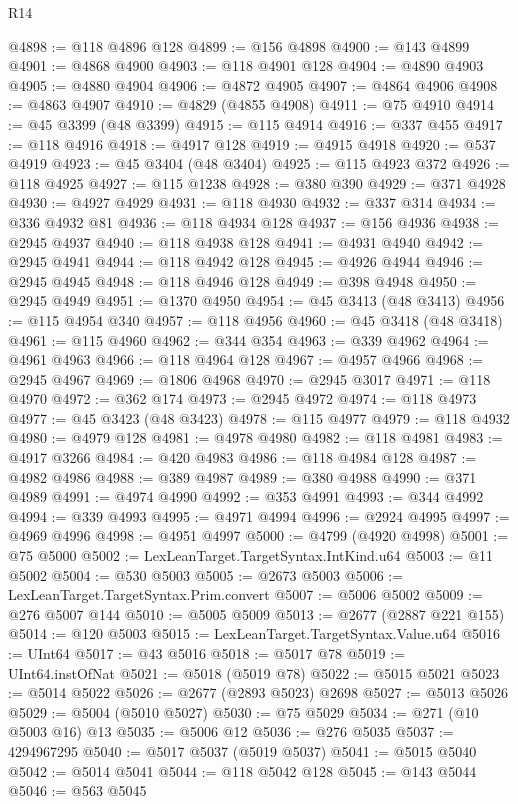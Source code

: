 \begin{lexlean}{R14}
\begin{coremodule}
{{{{{{{{{{{{{{{{{{{{{{{{{{{{{{{{{{{{{{{{{{{{{{{{{{{{{{{{{{{{{{{{{{{{{{{{{{{{{{{{{{@4898 := @118 @4896 @128
@4899 := @156 @4898
@4900 := @143 @4899
@4901 := @4868 @4900
@4903 := @118 @4901 @128
@4904 := @4890 @4903
@4905 := @4880 @4904
@4906 := @4872 @4905
@4907 := @4864 @4906
@4908 := @4863 @4907
@4910 := @4829 (@4855 @4908)
@4911 := @75 @4910
@4914 := @45 @3399 (@48 @3399)
@4915 := @115 @4914
@4916 := @337 @455
@4917 := @118 @4916
@4918 := @4917 @128
@4919 := @4915 @4918
@4920 := @537 @4919
@4923 := @45 @3404 (@48 @3404)
@4925 := @115 @4923 @372
@4926 := @118 @4925
@4927 := @115 @1238
@4928 := @380 @390
@4929 := @371 @4928
@4930 := @4927 @4929
@4931 := @118 @4930
@4932 := @337 @314
@4934 := @336 @4932 @81
@4936 := @118 @4934 @128
@4937 := @156 @4936
@4938 := @2945 @4937
@4940 := @118 @4938 @128
@4941 := @4931 @4940
@4942 := @2945 @4941
@4944 := @118 @4942 @128
@4945 := @4926 @4944
@4946 := @2945 @4945
@4948 := @118 @4946 @128
@4949 := @398 @4948
@4950 := @2945 @4949
@4951 := @1370 @4950
@4954 := @45 @3413 (@48 @3413)
@4956 := @115 @4954 @340
@4957 := @118 @4956
@4960 := @45 @3418 (@48 @3418)
@4961 := @115 @4960
@4962 := @344 @354
@4963 := @339 @4962
@4964 := @4961 @4963
@4966 := @118 @4964 @128
@4967 := @4957 @4966
@4968 := @2945 @4967
@4969 := @1806 @4968
@4970 := @2945 @3017
@4971 := @118 @4970
@4972 := @362 @174
@4973 := @2945 @4972
@4974 := @118 @4973
@4977 := @45 @3423 (@48 @3423)
@4978 := @115 @4977
@4979 := @118 @4932
@4980 := @4979 @128
@4981 := @4978 @4980
@4982 := @118 @4981
@4983 := @4917 @3266
@4984 := @420 @4983
@4986 := @118 @4984 @128
@4987 := @4982 @4986
@4988 := @389 @4987
@4989 := @380 @4988
@4990 := @371 @4989
@4991 := @4974 @4990
@4992 := @353 @4991
@4993 := @344 @4992
@4994 := @339 @4993
@4995 := @4971 @4994
@4996 := @2924 @4995
@4997 := @4969 @4996
@4998 := @4951 @4997
@5000 := @4799 (@4920 @4998)
@5001 := @75 @5000
@5002 := LexLeanTarget.TargetSyntax.IntKind.u64
@5003 := @11 @5002
@5004 := @530 @5003
@5005 := @2673 @5003
@5006 := LexLeanTarget.TargetSyntax.Prim.convert
@5007 := @5006 @5002
@5009 := @276 @5007 @144
@5010 := @5005 @5009
@5013 := @2677 (@2887 @221 @155)
@5014 := @120 @5003
@5015 := LexLeanTarget.TargetSyntax.Value.u64
@5016 := UInt64
@5017 := @43 @5016
@5018 := @5017 @78
@5019 := UInt64.instOfNat
@5021 := @5018 (@5019 @78)
@5022 := @5015 @5021
@5023 := @5014 @5022
@5026 := @2677 (@2893 @5023) @2698
@5027 := @5013 @5026
@5029 := @5004 (@5010 @5027)
@5030 := @75 @5029
@5034 := @271 (@10 @5003 @16) @13
@5035 := @5006 @12
@5036 := @276 @5035
@5037 := 4294967295
@5040 := @5017 @5037 (@5019 @5037)
@5041 := @5015 @5040
@5042 := @5014 @5041
@5044 := @118 @5042 @128
@5045 := @143 @5044
@5046 := @563 @5045
}}}}}}}}}}}}}}}}}}}}}}}}}}}}}}}}}}}}}}}}}}}}}}}}}}}}}}}}}}}}}}}}}}}}}}}}}}}}}}}}}}
\end{coremodule}
\end{lexlean}
